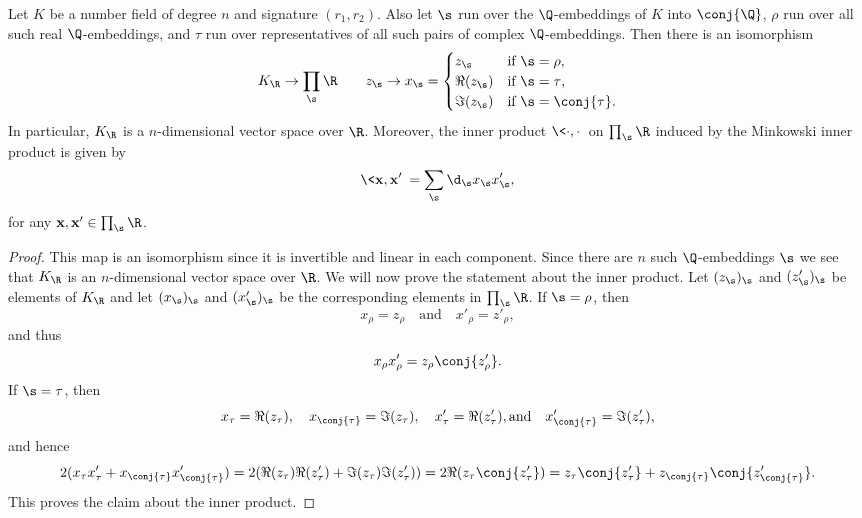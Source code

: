     \begin{proposition}\label{prop:Minkowski_space_isomorphism}
      Let $K$ be a number field of degree $n$ and signature $(r_{1},r_{2})$. Also let $\s$ run over the $\Q$-embeddings of $K$ into $\conj{\Q}$, $\rho$ run over all such real $\Q$-embeddings, and $\tau$ run over representatives of all such pairs of complex $\Q$-embeddings. Then there is an isomorphism
      \[
        K_{\R} \to \prod_{\s}\R \qquad z_{\s} \to x_{\s} = \begin{cases} z_{\s} & \text{if $\s = \rho$}, \\ \Re(z_{\s}) & \text{if $\s = \tau$}, \\ \Im(z_{\s}) & \text{if $\s = \conj{\tau}$}. \end{cases}
      \]
      In particular, $K_{\R}$ is a $n$-dimensional vector space over $\R$. Moreover, the inner product $\<\cdot,\cdot\>$ on $\prod_{\s}\R$ induced by the Minkowski inner product is given by
      \[
        \<\mathbf{x},\mathbf{x}'\> = \sum_{\s}\d_{\s}x_{\s}x'_{\s},
      \]
      for any $\mathbf{x},\mathbf{x}' \in \prod_{\s}\R$.
    \end{proposition}
    \begin{proof}
      This map is an isomorphism since it is invertible and linear in each component. Since there are $n$ such $\Q$-embeddings $\s$ we see that $K_{\R}$ is an $n$-dimensional vector space over $\R$. We will now prove the statement about the inner product. Let $(z_{\s})_{\s}$ and $(z'_{\s})_{\s}$ be elements of $K_{\R}$ and let $(x_{\s})_{\s}$ and $(x'_{\s})_{\s}$ be the corresponding elements in $\prod_{\s}\R$. If $\s = \rho$, then
      \[
        x_{\rho} = z_{\rho} \quad \text{and} \quad x'_{\rho} = z'_{\rho},
      \]
      and thus
      \[
        x_{\rho}x'_{\rho} = z_{\rho}\conj{z'_{\rho}}.
      \]
      If $\s = \tau$, then
      \[
        x_{\tau} = \Re(z_{\tau}), \quad x_{\conj{\tau}} = \Im(z_{\tau}), \quad x'_{\tau} = \Re(z'_{\tau}), \text{and} \quad x'_{\conj{\tau}} = \Im(z'_{\tau}),
      \]
      and hence
      \[
        2(x_{\tau}x'_{\tau}+x_{\conj{\tau}}x'_{\conj{\tau}}) = 2(\Re(z_{\tau})\Re(z'_{\tau})+\Im(z_{\tau})\Im(z'_{\tau})) = 2\Re(z_{\tau}\conj{z'_{\tau}}) = z_{\tau}\conj{z'_{\tau}}+z_{\conj{\tau}}\conj{z'_{\conj{\tau}}}.
      \]
      This proves the claim about the inner product.
    \end{proof}
    
